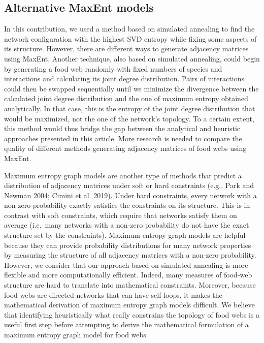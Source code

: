 \documentclass[11pt]{article}
\begin{document}
\hypertarget{alternative-maxent-models}{%
\subsection{Alternative MaxEnt models}\label{alternative-maxent-models}}

In this contribution, we used a method based on simulated annealing to
find the network configuration with the highest SVD entropy while fixing
some aspects of its structure. However, there are different ways to
generate adjacency matrices using MaxEnt. Another technique, also based
on simulated annealing, could begin by generating a food web randomly
with fixed numbers of species and interactions and calculating its joint
degree distribution. Pairs of interactions could then be swapped
sequentially until we minimize the divergence between the calculated
joint degree distribution and the one of maximum entropy obtained
analytically. In that case, this is the entropy of the joint degree
distribution that would be maximized, not the one of the network's
topology. To a certain extent, this method would thus bridge the gap
between the analytical and heuristic approaches presented in this
article. More research is needed to compare the quality of different
methods generating adjacency matrices of food webs using MaxEnt.

Maximum entropy graph models are another type of methods that predict a
distribution of adjacency matrices under soft or hard constraints (e.g.,
Park and Newman 2004; Cimini et al. 2019). Under hard constraints, every
network with a non-zero probability exactly satisfies the constraints on
its structure. This is in contrast with soft constraints, which require
that networks satisfy them on average (i.e.~many networks with a
non-zero probability do not have the exact structure set by the
constraints). Maximum entropy graph models are helpful because they can
provide probability distributions for many network properties by
measuring the structure of all adjacency matrices with a non-zero
probability. However, we consider that our approach based on simulated
annealing is more flexible and more computationally efficient. Indeed,
many measures of food-web structure are hard to translate into
mathematical constraints. Moreover, because food webs are directed
networks that can have self-loops, it makes the mathematical derivation
of maximum entropy graph models difficult. We believe that identifying
heuristically what really constrains the topology of food webs is a
useful first step before attempting to derive the mathematical
formulation of a maximum entropy graph model for food webs.
\end{document}
